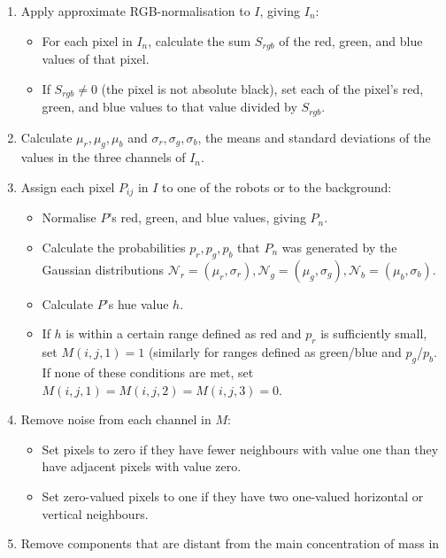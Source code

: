 \documentclass[10pt,a4paper]{article}
\begin{document}
\begin{enumerate}
    \item
    Apply approximate RGB-normalisation to $I$, giving $I_n$:
    \begin{itemize}
        \item
        For each pixel in $I_n$, calculate the sum $S_{rgb}$ of the red, green, 
        and blue values of that pixel.
        \item
        If $S_{rgb} \ne 0$ (the pixel is not absolute black), set each of the 
        pixel's red, green, and blue values to that value divided by $S_{rgb}$.
    \end{itemize}
    \item
    Calculate $\mu_r, \mu_g, \mu_b$ and $\sigma_r, \sigma_g, \sigma_b$, the 
    means and standard deviations of the values in the three channels of $I_n$.
    \item
    Assign each pixel $P_{ij}$ in $I$ to one of the robots or to the background:
    \begin{itemize}
        \item
        Normalise $P$'s red, green, and blue values, giving $P_n$.
        \item
        Calculate the probabilities $p_r, p_g, p_b$ that $P_n$ was generated 
        by the Gaussian distributions $\mathcal{N}_r = (\mu_r, \sigma_r),
        \mathcal{N}_g = (\mu_g, \sigma_g), \mathcal{N}_b = (\mu_b, \sigma_b)$.
        \item
        Calculate $P$'s hue value $h$.
        \item
        If $h$ is within a certain range defined as red and $p_r$ is
        sufficiently small, set $M(i,j,1) = 1$ (similarly for ranges defined as
        green/blue and $p_g$/$p_b$. If none of these conditions are met, set
        $M(i,j,1) = M(i,j,2) = M(i,j,3) = 0$.
    \end{itemize}
    \item
    Remove noise from each channel in $M$:
    \begin{itemize}
        \item
        Set pixels to zero if they have fewer neighbours with value one than
        they have adjacent pixels with value zero.
        \item
        Set zero-valued pixels to one if they have two one-valued 
        horizontal or vertical neighbours.
    \end{itemize}
    \item
    Remove components that are distant from the main concentration of mass in

\end{enumerate}
\end{document}
